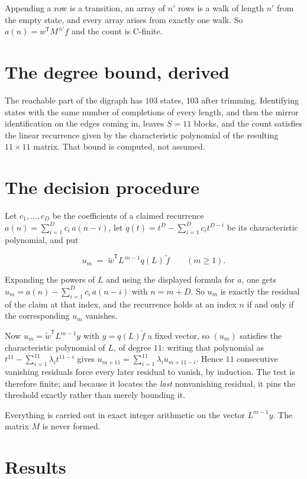 \documentclass[11pt]{article}
\theoremstyle{definition}
\begin{document}
Appending a row is a transition, an array of $n'$ rows is a walk of length $n'$ from the empty state, and every array arises from exactly one walk. So $a(n) = w^{\mathsf T}M^{\,n'}f$ and the count is C-finite.

\section{The degree bound, derived}

The reachable part of the digraph has $103$ states, $103$ after trimming. Identifying states with the same number of completions of every length, and then the mirror identification on the edges coming in, leaves $S = 11$ blocks, and the count satisfies the linear recurrence given by the characteristic polynomial of the resulting $11\times11$ matrix. That bound is computed, not assumed.

\section{The decision procedure}

Let $c_1,\dots,c_D$ be the coefficients of a claimed recurrence $a(n) = \sum_{i=1}^{D} c_i\,a(n-i)$, let $q(t) = t^{D} - \sum_{i=1}^{D} c_i t^{D-i}$ be its characteristic polynomial, and put

\[u_m \;=\; \tilde w^{\mathsf T} L^{\,m-1} q(L)\,\tilde f \qquad (m \ge 1).\]

Expanding the powers of $L$ and using the displayed formula for $a$, one gets $u_m = a(n) - \sum_{i=1}^{D} c_i\,a(n-i)$ with $n = m + D$. So $u_m$ is exactly the residual of the claim at that index, and the recurrence holds at an index $n$ if and only if the corresponding $u_m$ vanishes.

Now $u_m = \tilde w^{\mathsf T} L^{m-1} y$ with $y = q(L)\tilde f$ a fixed vector, so $(u_m)$ satisfies the characteristic polynomial of $L$, of degree $11$: writing that polynomial as $t^{11} - \sum_{i=1}^{11} \lambda_i t^{11-i}$ gives $u_{m+11} = \sum_{i=1}^{11} \lambda_i u_{m+11-i}$. Hence $11$ consecutive vanishing residuals force every later residual to vanish, by induction. The test is therefore finite; and because it locates the {\itshape last} nonvanishing residual, it pins the threshold exactly rather than merely bounding it.

Everything is carried out in exact integer arithmetic on the vector $L^{m-1}y$. The matrix $M$ is never formed.

\section{Results}
\end{document}
